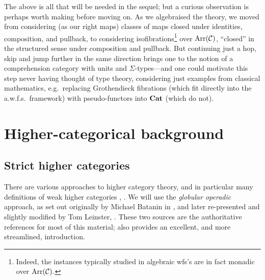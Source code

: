 \begin{para}
The above is all that will be needed in the sequel; but a curious observation is perhaps worth making before moving on.  As we algebraised the theory, we moved from considering (as our right maps) classes of maps closed under identities, composition, and pullback, to considering isofibrations\footnote{Indeed, the instances typically studied in algebraic wfs's are in fact monadic over $\mathrm{Arr}(\mathcal{C})$.} over $\mathrm{Arr}(\mathcal{C})$, ``closed'' in the structured sense under composition and pullback.  But continuing just a hop, skip and jump further in the same direction brings one to the notion of a comprehension category with units and $\Sigma$-types---and one could motivate this step never having thought of type theory, considering just examples from classical mathematics, e.g.\ replacing Grothendieck fibrations (which fit directly into the a.w.f.s.\ framework) with pseudo-functors into $\mathbf{Cat}$ (which do not).
\end{para}

\section{Higher-categorical background}

\subsection*{Strict higher categories}

There are various approaches to higher category theory, and in particular many definitions of weak higher categories \cite{leinster:ten-definitions}, \cite{cheng-lauda:guidebook}.  We will use the \emph{globular operadic} approach, as set out originally by Michael Batanin in \cite{batanin:natural-environment}, and later re-presented and slightly modified by Tom Leinster, \cite{leinster:book}.  These two sources are the authoritative references for most of this material; \cite{leinster:survey} also provides an excellent, and more streamlined, introduction.

